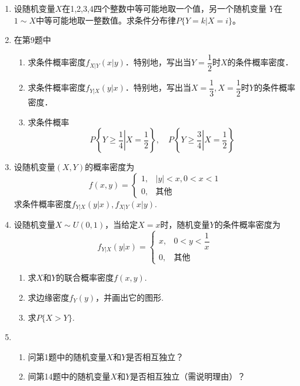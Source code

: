 \documentclass[10pt,a4paper]{article}
\begin{document}
\begin{enumerate}
     \item 设随机变量$X$在1,2,3,4四个整数中等可能地取一个值，另一个随机变量
     $Y$在$1\sim X$中等可能地取一整数值。求条件分布律$P\{Y=k|X=i\}$。
     \vspace{10cm}

     \item 在第9题中
     \begin{enumerate}
         \item 求条件概率密度$f_{X|Y}(x|y)$．特别地，写出当$Y=\dfrac{1}{2}$时$X$的条件概率密度．
         \item 求条件概率密度$f_{Y|X}(y|x)$．特别地，写出当$X=\dfrac{1}{3},X=\dfrac{1}{2}$时$Y$的条件概率密度．
         \item 求条件概率
         $$P\left\{Y\geq \frac{1}{4}\left|X=\frac{1}{2}\right.\right\},\quad P\left\{Y\geq \frac{3}{4}\left|X=\frac{1}{2}\right.\right\}$$
     \end{enumerate}
     \vspace{8cm}


     \item 设随机变量$(X,Y)$的概率密度为
     $$f(x,y)=\left\{\begin{array}{ll}
         1, & |y|<x,0<x<1\\
         0, & \mbox{其他}
     \end{array}\right.$$
     求条件概率密度$f_{Y|X}(y|x),f_{X|Y}(x|y)$.
     \vspace{10cm}


     \item 设随机变量$X\sim U(0,1)$，当给定$X=x$时，随机变量$Y$的条件概率密度为
     $$f_{Y|X}(y|x)=\left\{\begin{array}{ll}
         x, & 0<y<\dfrac{1}{x} \\
         0, & \mbox{其他}
     \end{array}\right.$$
     \begin{enumerate}
         \item 求$X$和$Y$的联合概率密度$f(x,y)$.
         \item 求边缘密度$f_Y(y)$，并画出它的图形.
         \item 求$P\{X>Y\}$.
     \end{enumerate}
     \vspace{9cm}


     \item \begin{enumerate}
         \item 问第1题中的随机变量$X$和$Y$是否相互独立？
         \item 间第14题中的随机变量$X$和$Y$是否相互独立（需说明理由）？
     \end{enumerate}
     \vspace{10cm}



\end{enumerate}
\end{document}
